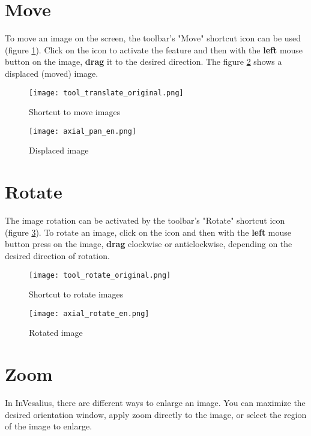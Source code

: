 \section{Move}

To move an image on the screen, the toolbar's "Move" shortcut icon can be used (figure
\ref{fig:move_icon}). Click on the icon to activate the feature and then with the \textbf{left} mouse button on the image, \textbf{drag} it to the desired direction. The figure \ref{fig:move_img} shows a displaced (moved) image.

\begin{figure}[!htb]
\centering
\texttt{[image: tool\_translate\_original.png]}
\caption{Shortcut to move images}
\label{fig:move_icon}
\end{figure}

\begin{figure}[!htb]
\centering
\texttt{[image: axial\_pan\_en.png]}
\caption{Displaced image}
\label{fig:move_img}
\end{figure}

\section{Rotate}

The image rotation can be activated by the toolbar's "Rotate" shortcut icon (figure \ref{fig:rot_icon}). To rotate an image, click on the icon and then with the \textbf{left} mouse button press on the image, \textbf{drag} clockwise or anticlockwise, depending on the desired direction of rotation.

\begin{figure}[!htb]
\centering
\texttt{[image: tool\_rotate\_original.png]}
\caption{Shortcut to rotate images}
\label{fig:rot_icon}
\end{figure}

\begin{figure}[!htb]
\centering
\texttt{[image: axial\_rotate\_en.png]}
\caption{Rotated image}
\label{fig:rotate_all}
\end{figure}


\section{Zoom}

In InVesalius, there are different ways to enlarge an image. You can maximize the desired orientation window, apply zoom directly to the image, or select the region of the image to enlarge.

